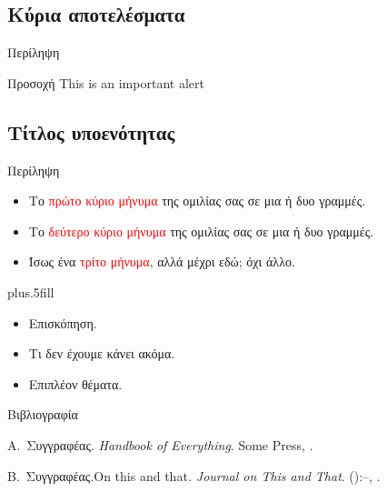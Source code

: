 \documentclass[greek]{beamer}
\begin{document}
\subsection{Κύρια αποτελέσματα}

\begin{frame}{Περίληψη}
   	\begin{alertblock}{Προσοχή}
   		\textlatin{This is an important alert}
   	\end{alertblock}
\end{frame}

\subsection{Τίτλος υποενότητας}

\begin{frame}{Περίληψη}
	\begin{itemize}
		\item Το \textcolor{red}{πρώτο κύριο μήνυμα} της ομιλίας σας σε μια ή δυο γραμμές.
		\item Το \textcolor{red}{δεύτερο κύριο μήνυμα} της ομιλίας σας σε μια ή δυο γραμμές.
		\item Ίσως ένα \textcolor{red}{τρίτο μήνυμα}, αλλά μέχρι εδώ; όχι άλλο.
	\end{itemize}
	\vskip0pt plus.5fill
	\begin{itemize}
		\item Επισκόπηση.
	\end{itemize}
	\begin{itemize}
		\item Τι δεν έχουμε κάνει ακόμα.
		\item Επιπλέον θέματα.
	\end{itemize}
\end{frame}

\begin{frame}{Βιβλιογραφία}
	\begin{thebibliography}{2}
		\beamertemplatebookbibitems
		Α.\ Συγγραφέας. \newblock\textlatin{\emph{Handbook of Everything}}.\newblock
\textlatin{Some Press, }.

		\beamertemplatearticlebibitems
		Β.\ Συγγραφέας.\newblock \textlatin{On this and that}\emph{.}
\newblock\textlatin{\emph{Journal on This and That}}. 
():--, 
.
	\end{thebibliography}
\end{frame}

\end{document}
